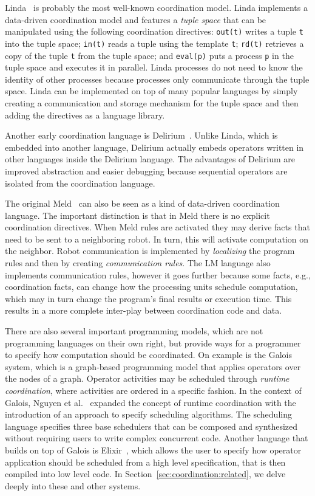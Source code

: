 Linda~\cite{linda} is probably the most well-known coordination model. Linda
implements a data-driven coordination model and features a \emph{tuple space}
that can be manipulated using the following coordination directives:
\texttt{out(t)} writes a tuple \texttt{t} into the tuple space; \texttt{in(t)}
reads a tuple using the template \texttt{t}; \texttt{rd(t)} retrieves a copy of
the tuple \texttt{t} from the tuple space; and \texttt{eval(p)} puts a process
\texttt{p} in the tuple space and executes it in parallel.  Linda processes do
not need to know the identity of other processes because processes only
communicate through the tuple space.  Linda can be implemented on top of many
popular languages by simply creating a communication and storage mechanism for
the tuple space and then adding the directives as a language library.

Another early coordination language is Delirium~\cite{Delirium}. Unlike Linda,
which is embedded into another language, Delirium actually embeds operators
written in other languages inside the Delirium language. The advantages of
Delirium are improved abstraction and easier debugging because sequential
operators are isolated from the coordination language.

The original Meld~\cite{ashley-rollman-iclp09} can also be seen as a kind of
data-driven coordination language. The important distinction is that in Meld
there is no explicit coordination directives. When Meld rules are activated they
may derive facts that need to be sent to a neighboring robot. In turn, this will
activate computation on the neighbor. Robot communication is implemented by
\emph{localizing} the program rules and then by creating \emph{communication
rules}. The LM language also implements communication rules, however it goes
further because some facts, e.g., coordination facts, can change how the
processing units schedule computation, which may in turn change the program's
final results or execution time. This results in a more complete inter-play
between coordination code and data.

There are also several important programming models, which are not programming
languages on their own right, but provide ways for a programmer to specify how
computation should be coordinated. On example is the
Galois~\cite{Pingali:2011:TPA:1993316.1993501} system, which is a graph-based
programming model that applies operators over the nodes of a graph. Operator
activities may be scheduled through \emph{runtime coordination}, where
activities are ordered in a specific fashion. In the context of Galois, Nguyen
et al.~\cite{nguyen11} expanded the concept of runtime coordination with the
introduction of an approach to specify scheduling algorithms. The scheduling
language specifies three base schedulers that can be composed and synthesized
without requiring users to write complex concurrent code.  Another language that
builds on top of Galois is Elixir~\cite{Prountzos:2012:ESS:2384616.2384644},
which allows the user to specify how operator application should be scheduled
from a high level specification, that is then compiled into low level code. In
Section~\ref{sec:coordination:related}, we delve deeply into these and other
systems.

